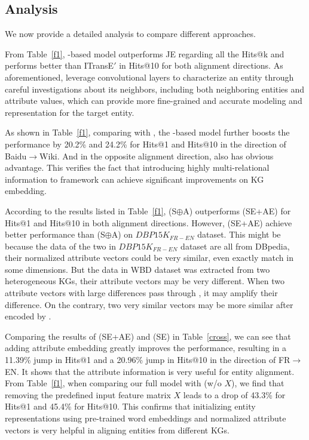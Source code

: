 \subsection{Analysis\label{sec:analysis}}



We now provide a detailed analysis to compare different approaches.

From Table~\ref{f1}, \GCN-based model outperforms JE regarding all the Hits@k and performs better than ITransE$'$ in Hits@10 for both alignment directions. As aforementioned, \GCNs leverage convolutional layers to characterize an entity through careful investigations about its neighbors, including both neighboring entities and attribute values, which can provide more fine-grained and accurate modeling and representation for the target entity.

 As shown in Table~\ref{f1}, comparing with \GCN, the \RGCN-based model further boosts the performance by 20.2\% and 24.2\% for Hits@1 and Hits@10 in the direction of Baidu$\rightarrow$Wiki. And in the opposite alignment direction, \RGCN also has obvious advantage. This verifies the fact that introducing highly multi-relational information to \GCN framework can achieve significant improvements on KG embedding.

According to the results listed in Table~\ref{f1}, \HRGCN (S$\oplus$A) outperforms \HRGCN (SE+AE) for Hits@1 and Hits@10 in both alignment directions. However, \HRGCN (SE+AE) achieve better performance than \HRGCN (S$\oplus$A) on $DBP15K_{FR-EN}$ dataset. This might be because the data of the two \KGs in $DBP15K_{FR-EN}$ dataset are all from DBpedia, their normalized attribute vectors could be very similar, even exactly match in some dimensions. But the data in WBD dataset was extracted from two heterogeneous KGs, their attribute vectors may be very different. When two attribute vectors with large differences pass through \HRGCNs, it may amplify their difference. On the contrary, two very similar vectors may be more similar after encoded by \HRGCNs.


Comparing the results of \HRGCN (SE+AE) and \HRGCN (SE) in Table~\ref{cross}, we can see that adding attribute embedding greatly improves the performance, resulting in a 11.39\% jump in Hits@1 and a 20.96\% jump in Hits@10 in the direction of FR$\rightarrow$EN. It shows that the attribute information is very useful for entity alignment.
From Table~\ref{f1}, when comparing our full model \HRGCN with \HRGCN (w/o $X$), we find that removing the predefined input feature matrix $X$ leads to a drop of 43.3\% for Hits@1 and 45.4\% for Hits@10. This confirms that initializing entity representations using pre-trained word embeddings and normalized attribute vectors is very helpful in aligning entities from different KGs.

